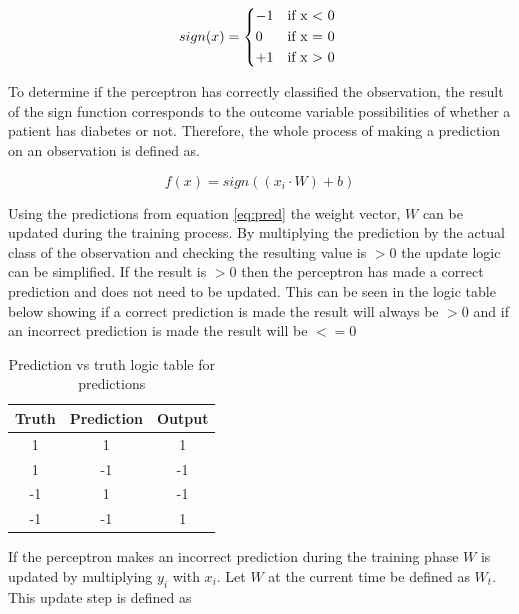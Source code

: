 \documentclass[10pt,twocolumn,letterpaper]{article}
\begin{document}
\begin{equation}
   sign(x)= \begin{cases*}
      -1 & if x $<$ 0 \\
      0  & if x = 0   \\
      +1 & if x $>$ 0 \\
   \end{cases*}
\end{equation}

To determine if the perceptron has correctly classified the observation, the result of the sign function
corresponds to the outcome variable possibilities of whether a patient has diabetes or not. Therefore, the
whole process of making a prediction on an observation is defined as.

\begin{equation}\label{eq:pred}
   f(x) = sign((x_i \cdot W) + b)
\end{equation}

Using the predictions from equation \eqref{eq:pred} the weight vector, $W$ can be updated during the training process.
By multiplying the prediction by the actual class of the observation and checking the resulting value is $>0$
the update logic can be simplified. If the result is $>0$ then the perceptron has made a correct prediction
and does not need to be updated. This can be seen in the logic table below showing if a correct
prediction is made the result will always be $>0$ and if an incorrect prediction is made the result will be
$<=0$
\begin{table}[h!]
   \centering
   \begin{tabular}{ ||c c c|| }
      \hline
      Truth & Prediction & Output \\
      \hline
      1     & 1          & 1      \\
      \hline
      1     & -1         & -1     \\
      \hline
      -1    & 1          & -1     \\
      \hline
      -1    & -1         & 1      \\
      \hline
   \end{tabular}      \label{tab:logic}
   \caption{Prediction vs truth logic table for predictions}
\end{table}

If the perceptron makes an incorrect prediction during the training phase $W$ is updated by multiplying
$y_i$ with $x_i$. Let $W$ at the current time be defined as $W_t$. This update step is defined as
\end{document}
